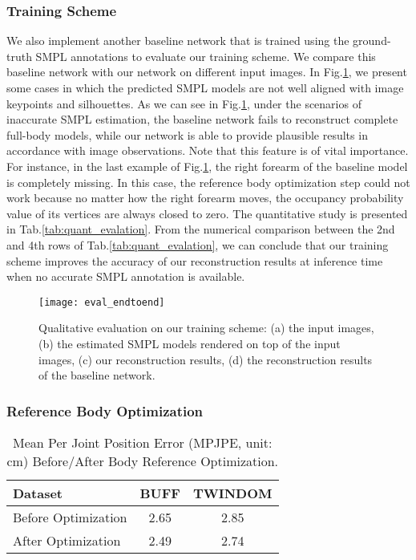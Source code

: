 \subsubsection{Training Scheme}
\label{sec:eval:end2end}


We also implement another baseline network that is trained using the ground-truth SMPL annotations to evaluate our training scheme. We compare this baseline network with our network on different input images. In Fig.\ref{fig:eval_endtoend}, we present some cases in which the predicted SMPL models are not well aligned with image keypoints and silhouettes. As we can see in Fig.\ref{fig:eval_endtoend}, under the scenarios of inaccurate SMPL estimation, the baseline network fails to reconstruct complete full-body models, while our network is able to provide plausible results in accordance with image observations. Note that this feature is of vital importance. For instance, in the last example of Fig.\ref{fig:eval_endtoend}, the right forearm of the baseline model is completely missing. In this case, the reference body optimization step could not work because no matter how the right forearm moves, the occupancy probability value of its vertices are always closed to zero. The quantitative study is presented in Tab.\ref{tab:quant_evalation}. From the numerical comparison between the 2nd and 4th rows of Tab.\ref{tab:quant_evalation}, we can conclude that our training scheme improves the accuracy of our reconstruction results at inference time when no accurate SMPL annotation is available. 

\begin{figure}
	\begin{center}
		\texttt{[image: eval\_endtoend]}
	\end{center}
	\caption{Qualitative evaluation on our training scheme: (a) the input images, (b) the estimated SMPL models rendered on top of the input images, (c) our reconstruction results, (d) the reconstruction results of the baseline network. }
	\label{fig:eval_endtoend}
\end{figure}

\subsubsection{Reference Body Optimization}


\begin{table}
    \centering
    \caption{Mean Per Joint Position Error (MPJPE, unit: cm) Before/After Body Reference Optimization. }
    \label{tab:smpl_accu}
    \begin{tabular}{lcc}
        \toprule
         Dataset & BUFF & TWINDOM   \\
         \midrule
         Before Optimization & 2.65 & 2.85 \\
         After Optimization  & 2.49 & 2.74 \\ 
         \bottomrule
    \end{tabular}
 \end{table}

